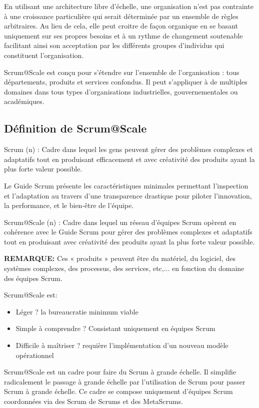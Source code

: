 \documentclass[french,12pt,a4paper,parskip=full]{scrartcl}
\begin{document}
En utilisant une architecture libre d'échelle, une organisation n'est pas contrainte à une
croissance particulière qui serait déterminée par un ensemble de règles arbitraires. Au lieu
de cela, elle peut croitre de façon organique en se basant uniquement sur ses propres
besoins et à un rythme de changement soutenable facilitant ainsi son acceptation par les
différents groupes d'individus qui constituent l'organisation.

Scrum@Scale est conçu pour s'étendre sur l'ensemble de l'organisation : tous
départements, produits et services confondus. Il peut s'appliquer à de multiples domaines
dans tous types d'organisations industrielles, gouvernementales ou académiques.

\subsection{Définition de Scrum@Scale}
Scrum (n) : Cadre dans lequel les gens peuvent gérer des problèmes complexes et
adaptatifs tout en produisant efficacement et avec créativité des produits ayant la plus
forte valeur possible.

Le Guide Scrum présente les caractéristiques minimales permettant l'inspection et
l'adaptation au travers d'une transparence drastique pour piloter l'innovation, la
performance, et le bien-être de l'équipe.

Scrum@Scale (n) : Cadre dans lequel un réseau d'équipes Scrum opèrent en cohérence
avec le Guide Scrum pour gérer des problèmes complexes et adaptatifs tout en produisant
avec créativité des produits ayant la plus forte valeur possible.

\textbf{REMARQUE:} Ces « produits » peuvent être du matériel, du logiciel, des systèmes
complexes, des processus, des services, etc,... en fonction du domaine des équipes
Scrum.

Scrum@Scale est:
\begin{itemize}
\item Léger ? la bureaucratie minimum viable
\item Simple à comprendre ? Consistant uniquement en équipes Scrum
\item Difficile à maîtriser ? requière l'implémentation d'un nouveau modèle opérationnel
\end{itemize}


Scrum@Scale est un cadre pour faire du Scrum à grande échelle. Il simplifie radicalement
le passage à grande échelle par l'utilisation de Scrum pour passer Scrum à grande
échelle. Ce cadre se compose uniquement d'équipes Scrum coordonnées via des Scrum
de Scrums et des MetaScrums.
\end{document}
